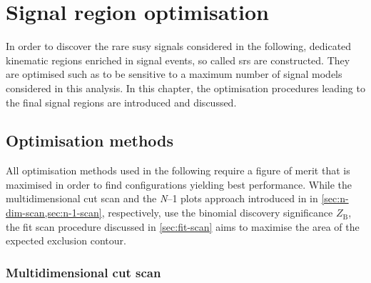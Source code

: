 

\chapter{Signal region optimisation}\label{ch:signal_region_optimisation}

\graphicspath{{chapter-optimisation/Figs/Vector/}{chapter-optimisation/Figs/}}


In order to discover the rare \gls{susy} signals considered in the following, dedicated kinematic regions enriched in signal events, so called \glspl{sr} are constructed.
They are optimised such as to be sensitive to a maximum number of signal models considered in this analysis.
In this chapter, the optimisation procedures leading to the final signal regions are introduced and discussed. 

\section{Optimisation methods}

All optimisation methods used in the following require a figure of merit that is maximised in order to find configurations yielding best performance.
While the multidimensional cut scan and the \textit{N}--1 plots approach introduced in in \cref{sec:n-dim-scan,sec:n-1-scan}, respectively, use the binomial discovery significance $Z_\mathrm{B}$, the fit scan procedure discussed in \cref{sec:fit-scan} aims to maximise the area of the expected exclusion contour.

\subsection{Multidimensional cut scan}\label{sec:n-dim-scan}

